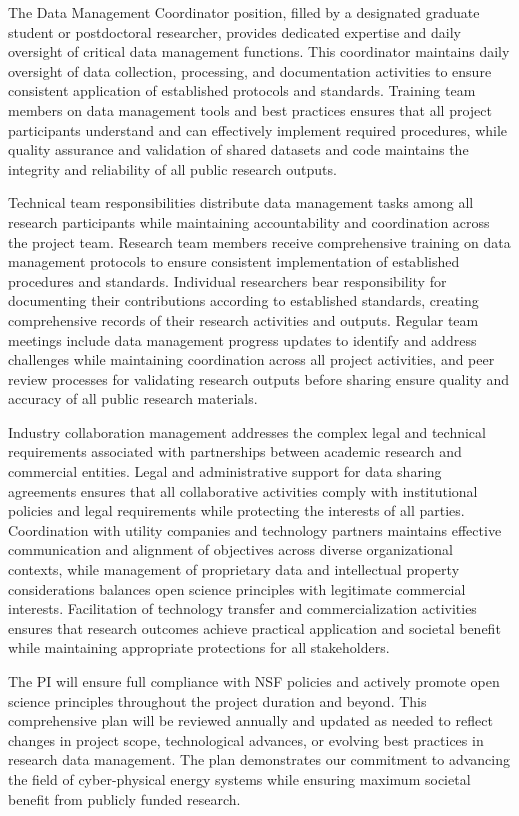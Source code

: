 \documentclass[12pt]{article}
\begin{document}
The Data Management Coordinator position, filled by a designated graduate student or postdoctoral researcher, provides dedicated expertise and daily oversight of critical data management functions. This coordinator maintains daily oversight of data collection, processing, and documentation activities to ensure consistent application of established protocols and standards. Training team members on data management tools and best practices ensures that all project participants understand and can effectively implement required procedures, while quality assurance and validation of shared datasets and code maintains the integrity and reliability of all public research outputs.

Technical team responsibilities distribute data management tasks among all research participants while maintaining accountability and coordination across the project team. Research team members receive comprehensive training on data management protocols to ensure consistent implementation of established procedures and standards. Individual researchers bear responsibility for documenting their contributions according to established standards, creating comprehensive records of their research activities and outputs. Regular team meetings include data management progress updates to identify and address challenges while maintaining coordination across all project activities, and peer review processes for validating research outputs before sharing ensure quality and accuracy of all public research materials.

Industry collaboration management addresses the complex legal and technical requirements associated with partnerships between academic research and commercial entities. Legal and administrative support for data sharing agreements ensures that all collaborative activities comply with institutional policies and legal requirements while protecting the interests of all parties. Coordination with utility companies and technology partners maintains effective communication and alignment of objectives across diverse organizational contexts, while management of proprietary data and intellectual property considerations balances open science principles with legitimate commercial interests. Facilitation of technology transfer and commercialization activities ensures that research outcomes achieve practical application and societal benefit while maintaining appropriate protections for all stakeholders.


The PI will ensure full compliance with NSF policies and actively promote open science principles throughout the project duration and beyond. This comprehensive plan will be reviewed annually and updated as needed to reflect changes in project scope, technological advances, or evolving best practices in research data management. The plan demonstrates our commitment to advancing the field of cyber-physical energy systems while ensuring maximum societal benefit from publicly funded research.
\end{document}
